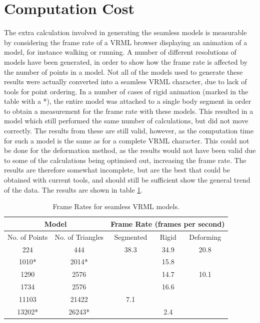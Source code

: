 \documentclass[10pt,oneside,fleqn,a4paper]{book}
\begin{document}
\section{\label{sec:resultcost}Computation Cost}
The extra calculation involved in generating the seamless models is measurable by considering the frame rate of a VRML browser displaying an animation of a model, for instance walking or running. A number of different resolutions of models have been generated, in order to show how the frame rate is affected by the number of points in a model. Not all of the models used to generate these results were actually converted into a seamless VRML character, due to lack of tools for point ordering. In a number of cases of rigid animation (marked in the table with a *), the entire model was attached to a single body segment in order to obtain a measurement for the frame rate with these models. This resulted in a model which still performed the same number of calculations, but did not move correctly. The results from these are still valid, however, as the computation time for such a model is the same as for a complete VRML character. This could not be done for the deformation method, as the results would not have been valid due to some of the calculations being optimised out, increasing the frame rate. The results are therefore somewhat incomplete, but are the best that could be obtained with current tools, and should still be sufficient show the general trend of the data. The results are shown in table \ref{tbl:framerates}.

\begin{table}[htbp]
\begin{center}
\begin{tabular}{|c|c||c|c|c|} \hline
\multicolumn{2}{|c||}{Model} & \multicolumn{3}{c|}{Frame Rate (frames per second)} \\ \hline
No. of Points & No. of Triangles & Segmented & Rigid & Deforming \\ \hline\hline
224 & 444 & 38.3 & 34.9 & 20.8 \\ \hline
1010*& 2014* & & 15.8 & \\ \hline
1290 & 2576 & & 14.7 & 10.1 \\ \hline
1734 & 2576 & & 16.6 & \\ \hline
11103 & 21422 & 7.1 & & \\ \hline
13202* & 26243* & & 2.4 & \\ \hline

\end{tabular}
\end{center}
\caption[Frame Rates for Seamless VRML models]{\label{tbl:framerates}Frame Rates for seamless VRML models.}
\end{table}
\end{document}
